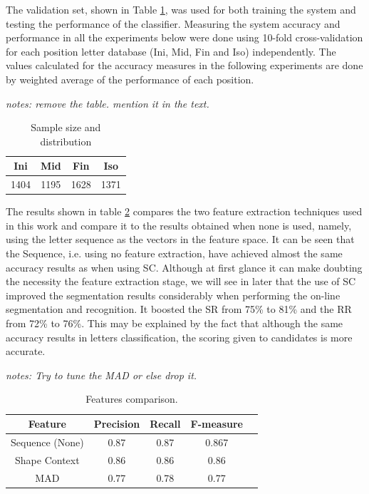 \documentclass[10pt, conference, compsocconf]{IEEEtran}
\theoremstyle{definition}
\begin{document}
The validation set, shown in Table \ref{table:sample_set}, was used for both training the system and testing the performance of the classifier.
Measuring the system accuracy and performance in all the experiments below were done using 10-fold cross-validation for each position letter database (Ini, Mid, Fin and Iso) independently.
The values calculated for the accuracy measures in the following experiments are done by weighted average of the performance of each position.

\emph{notes: remove the table. mention it in the text.}
\begin{table}
\centering
\begin{tabular}{ | c | c | c | c |}
\hline                 
  Ini & Mid & Fin & Iso \\ 
  \hline
  1404 & 1195 & 1628 & 1371 \\
  \hline
\end{tabular}
\caption{Sample size and distribution}
\label{table:sample_set} 
\end{table}

The results shown in table \ref{table:features_comparison} compares the two feature extraction techniques used in this work and compare it to the results obtained when none is used, namely, using the letter sequence as the vectors in the feature space.
It can be seen that the Sequence, i.e. using no feature extraction, have achieved almost the same accuracy results as when using SC.
Although at first glance it can make doubting the necessity the feature extraction stage, we will see in later that the use of SC improved the segmentation results considerably when performing the on-line segmentation and recognition.
It boosted the SR from 75\% to 81\% and the RR from 72\% to 76\%.
This may be explained by the fact that although the same accuracy results in letters classification, the scoring given to candidates is more accurate.


\emph{notes: Try to tune the MAD or else drop it.}
\begin{table}
\centering
\begin{tabular}{ | c | c | c | c | c |}
\hline
Feature & Precision & Recall & F-measure \\
\hline                 
  Sequence  (None) &  0.87 & 0.87 & 0.867 \\
  \hline
  Shape Context & 0.86 & 0.86 & 0.86 \\
  \hline
  MAD & 0.77 & 0.78 & 0.77 \\
  \hline
\end{tabular}
\caption{Features comparison. }
\label{table:features_comparison} 
\end{table}
\end{document}
